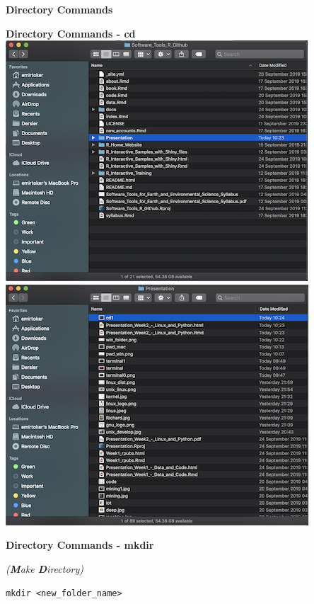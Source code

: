\documentclass[ignorenonframetext,]{beamer}
\begin{document}
\begin{frame}[fragile]{\textbf{Directory Commands}}
\begin{block}{\textbf{Directory Commands - {\textbf{cd}}}}
\includegraphics{cd1.png} \includegraphics{cd2.png}

\end{block}

\begin{block}{\textbf{Directory Commands - {\textbf{mkdir}}}}

\emph{(\textbf{M}ake \textbf{D}irectory)}

\begin{verbatim}
mkdir <new_folder_name>
\end{verbatim}


\end{block}
\end{frame}
\end{document}
